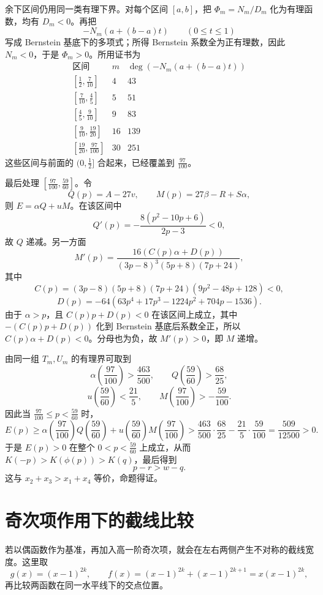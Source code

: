 \begin{solution}
余下区间仍用同一类有理下界。对每个区间 $[a,b]$，把 $\Phi_m=N_m/D_m$ 化为有理函数，均有 $D_m<0$。再把
\[
-N_m(a+(b-a)t)\qquad(0\le t\le1)
\]
写成 Bernstein 基底下的多项式；所得 Bernstein 系数全为正有理数，因此 $N_m<0$，于是 $\Phi_m>0$。所用证书为
\[
\begin{array}{c|c|c}
\text{区间} & m & \deg(-N_m(a+(b-a)t))\\
\hline
\left[\frac12,\frac7{10}\right] & 4 & 43\\
\left[\frac7{10},\frac45\right] & 5 & 51\\
\left[\frac45,\frac9{10}\right] & 9 & 83\\
\left[\frac9{10},\frac{19}{20}\right] & 16 & 139\\
\left[\frac{19}{20},\frac{97}{100}\right] & 30 & 251
\end{array}
\]
这些区间与前面的 $(0,\frac12]$ 合起来，已经覆盖到 $\frac{97}{100}$。

最后处理 $\left[\frac{97}{100},\frac{59}{60}\right]$。令
\[
Q(p)=A-27v,\qquad M(p)=27\beta-R+S\alpha,
\]
则 $E=\alpha Q+uM$。在该区间中
\[
Q'(p)=-\frac{8(p^2-10p+6)}{2p-3}<0,
\]
故 $Q$ 递减。另一方面
\[
M'(p)=\frac{16(C(p)\alpha+D(p))}{(3p-8)^3(5p+8)(7p+24)},
\]
其中
\[
C(p)=(3p-8)(5p+8)(7p+24)(9p^2-48p+128)<0,
\]
\[
D(p)=-64(63p^4+17p^3-1224p^2+704p-1536).
\]
由于 $\alpha>p$，且 $C(p)p+D(p)<0$ 在该区间上成立，其中 $-(C(p)p+D(p))$ 化到 Bernstein 基底后系数全正，所以 $C(p)\alpha+D(p)<0$。分母也为负，故 $M'(p)>0$，即 $M$ 递增。

由同一组 $T_m,U_m$ 的有理界可取到
\[
\alpha\left(\frac{97}{100}\right)>\frac{463}{500},\qquad
Q\left(\frac{59}{60}\right)>\frac{68}{25},
\]
\[
u\left(\frac{59}{60}\right)<\frac{21}{5},\qquad
M\left(\frac{97}{100}\right)>-\frac{59}{100}.
\]
因此当 $\frac{97}{100}\le p<\frac{59}{60}$ 时，
\[
E(p)\ge
\alpha\left(\frac{97}{100}\right)Q\left(\frac{59}{60}\right)
 +u\left(\frac{59}{60}\right)M\left(\frac{97}{100}\right)
>\frac{463}{500}\cdot\frac{68}{25}-\frac{21}{5}\cdot\frac{59}{100}
=\frac{509}{12500}>0.
\]
于是 $E(p)>0$ 在整个 $0<p<\frac{59}{60}$ 上成立，从而 $K(-p)>K(\phi(p))>K(q)$，最后得到
\[
p-r>w-q.
\]
这与 $x_2+x_3>x_1+x_4$ 等价，命题得证。
\end{solution}

\section{奇次项作用下的截线比较}

若以偶函数作为基准，再加入高一阶奇次项，就会在左右两侧产生不对称的截线宽度。这里取
\[
g(x)=(x-1)^{2k},\qquad
f(x)=(x-1)^{2k}+(x-1)^{2k+1}=x(x-1)^{2k},
\]
再比较两函数在同一水平线下的交点位置。

